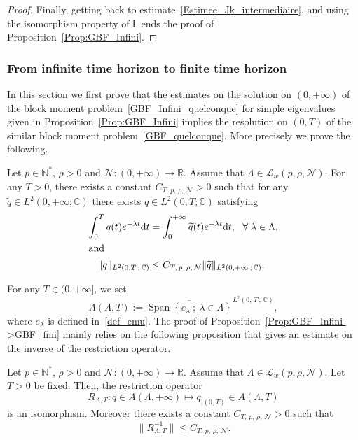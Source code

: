 \documentclass[AHL,Unicode,longabstracts]{cedram}
\newcommand{\LL}{\mathcal{L}}
\newcommand{\NN}{\mathcal{N}}
\newcommand{\N}{\mathbb{N}}
\newcommand{\R}{\mathbb{R}}
\newcommand{\C}{\mathbb{C}}
\newcommand{\md}{\mathrm{d}}
\DeclareMathOperator{\Span}{Span}
\let\oldforall\forall
\renewcommand*{\forall}{\mathrel{\oldforall}}
\begin{document}
\begin{proof}
Finally, getting back to estimate~\eqref{Estimee_Jk_intermediaire}, and using the isomorphism property of $\mathsf{L}$ ends the proof of Proposition~\ref{Prop:GBF_Infini}.
\end{proof}



\subsubsection{From infinite time horizon to finite time horizon}\label{Sec:BBM_finite}

In this section we first prove that the estimates on the solution on $(0,+\infty)$ of the block moment problem~\eqref{GBF_Infini_quelconque} for simple eigenvalues given in Proposition~\ref{Prop:GBF_Infini} implies the resolution on $(0,T)$ of the similar block moment problem~\eqref{GBF_quelconque}. More precisely we prove the following.

\begin{prop}\label{Prop:GBF_Infini->GBF_fini}
Let $p \in \N^*$, $ \rho > 0$ and $\NN : (0,+\infty) \to \R$. Assume that $\Lambda \in \LL_w(p,\rho, \NN)$. For any $T>0$, there exists a constant $C_{T,\,p,\,\rho,\,\NN}>0$ such that for any $\widetilde{q} \in L^2(0,+\infty ; \C)$ there exists $q \in L^2(0,T ; \C)$ satisfying
\begin{align*}
\int_0^T q(t) e^{- \lambda t} \md t &= \int_0^{+\infty} \widetilde{q}(t) e^{-\lambda t} \md t, \ \ \forall \lambda\in \Lambda,\label{GBF:Restriction_egalite}\\
\intertext{and}
\| q \|_{L^2(0,T\,;\,\C) } &\leq C_{T,\,p,\,\rho,\, \NN} \| \widetilde{q} \|_{L^2(0,+\infty\,;\, \C)}.
\end{align*}
\end{prop}
For any $T \in (0, +\infty]$, we set
\[
A(\Lambda,T) := \overline{ \Span \left\{ e_\lambda \: ; \: \lambda\in \Lambda\right\}}^{L^2(0,\,T\,;\,\C)},
\]
where $e_\lambda$ is defined in~\eqref{def_emu}. The proof of Proposition~\ref{Prop:GBF_Infini->GBF_fini} mainly relies on the following proposition that gives an estimate on the inverse of the restriction operator.

\begin{prop}\label{Prop:Restriction}
Let $p \in \N^*$, $\rho > 0$ and $\NN : (0,+\infty) \to \R$. Assume that $\Lambda \in \LL_w(p,\rho, \NN)$. Let $T>0$ be fixed. Then, the restriction operator
\begin{equation}\label{OperateurRestriction}
R_{\Lambda,T} : q \in A(\Lambda,+\infty) \mapsto q_{|(0,T)} \in A(\Lambda,T)
\end{equation}
is an isomorphism. Moreover there exists a constant $C_{T,\,p,\,\rho,\,\NN}>0$ such that
\begin{equation}\label{Estimee_Operateur_Restriction}
\| R_{\Lambda,T}^{-1} \| \leq C_{T,\,p,\,\rho,\,\NN}.
\end{equation}
\end{prop}
\end{document}
